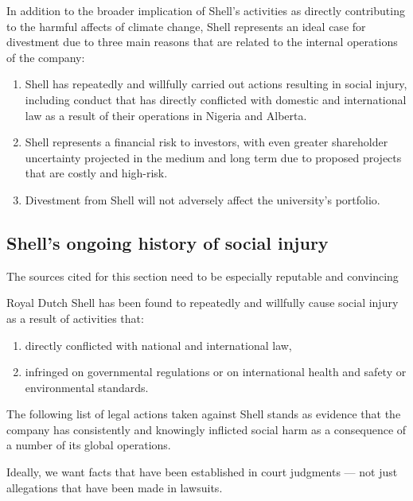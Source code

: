 		
			
In addition to the broader implication of Shell's activities as directly contributing to the harmful affects of climate change, Shell represents an ideal case for divestment due to three main reasons that are related to the internal operations of the company: 
\begin{enumerate}
	\item Shell has repeatedly and willfully carried out actions resulting in social injury, including conduct that has directly conflicted with domestic and international law as a result of their operations in Nigeria and Alberta.
	\item Shell represents a financial risk to investors, with even greater shareholder uncertainty projected in the medium and long term due to proposed projects that are costly and high-risk.
	\item Divestment from Shell will not adversely affect the university’s portfolio.
\end{enumerate}



	\subsection{Shell's ongoing history of social injury}

\begin{vcom}
	The sources cited for this section need to be especially reputable and convincing
\end{vcom}

Royal Dutch Shell has been found to repeatedly and willfully cause social injury as a result of activities that:
\begin{enumerate}
	\item directly conflicted with national and international law,
	\item infringed on governmental regulations or on international health and safety or environmental standards. 
\end{enumerate}
The following list of legal actions taken against Shell stands as evidence that the company has consistently and knowingly inflicted social harm as a consequence of a number of its global operations.

\begin{vcom}
	Ideally, we want facts that have been established in court judgments --- not just allegations that have been made in lawsuits.
\end{vcom}

